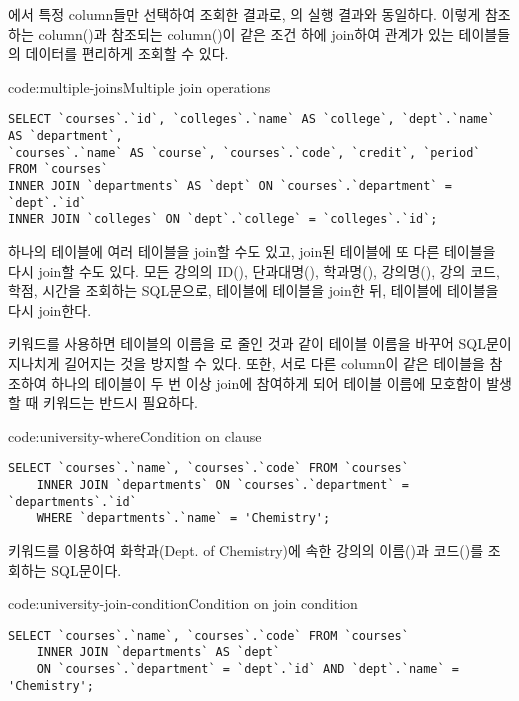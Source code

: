 \는 에서 특정 column들만 선택하여 조회한 결과로, 의 실행 결과와 동일하다. 이렇게 참조하는 column()과 참조되는 column()이 같은 조건 하에 join하여 관계가 있는 테이블들의 데이터를 편리하게 조회할 수 있다.

\begin{code}{code:multiple-joins}{Multiple join operations}
\begin{verbatim}
SELECT `courses`.`id`, `colleges`.`name` AS `college`, `dept`.`name` AS `department`,
`courses`.`name` AS `course`, `courses`.`code`, `credit`, `period` FROM `courses`
INNER JOIN `departments` AS `dept` ON `courses`.`department` = `dept`.`id`
INNER JOIN `colleges` ON `dept`.`college` = `colleges`.`id`;
\end{verbatim}
\end{code}

하나의 테이블에 여러 테이블을 join할 수도 있고, join된 테이블에 또 다른 테이블을 다시 join할 수도 있다. \는 모든 강의의 ID(), 단과대명(), 학과명(), 강의명(), 강의 코드, 학점, 시간을 조회하는 SQL문으로,  테이블에  테이블을 join한 뒤,  테이블에  테이블을 다시 join한다.

 키워드를 사용하면  테이블의 이름을 로 줄인 것과 같이 테이블 이름을 바꾸어 SQL문이 지나치게 길어지는 것을 방지할 수 있다. 또한, 서로 다른 column이 같은 테이블을 참조하여 하나의 테이블이 두 번 이상 join에 참여하게 되어 테이블 이름에 모호함이 발생할 때  키워드는 반드시 필요하다.

\begin{code}{code:university-where}{Condition on  clause}
\begin{verbatim}
SELECT `courses`.`name`, `courses`.`code` FROM `courses`
    INNER JOIN `departments` ON `courses`.`department` = `departments`.`id`
    WHERE `departments`.`name` = 'Chemistry';
\end{verbatim}
\end{code}

\는  키워드를 이용하여 화학과(Dept. of Chemistry)에 속한 강의의 이름()과 코드()를 조회하는 SQL문이다.

\begin{code}{code:university-join-condition}{Condition on join condition}
\begin{verbatim}
SELECT `courses`.`name`, `courses`.`code` FROM `courses`
    INNER JOIN `departments` AS `dept`
    ON `courses`.`department` = `dept`.`id` AND `dept`.`name` = 'Chemistry';
\end{verbatim}
\end{code}

